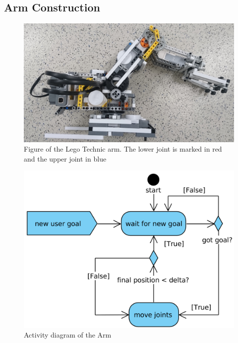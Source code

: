 \documentclass[conference]{IEEEtran}
\begin{document}
\subsection{Arm Construction}\label{sec:construction}
\begin{figure}[bt] 
	\centering
	\includegraphics[width=\textwidth/2]{img/arm_full}
	\caption[caption]{Figure of the Lego Technic arm. The lower joint is marked in red and the upper joint in blue}
	\label{fig:arm_full}
\end{figure}
\begin{figure}[bt] 
	\centering
	\includegraphics[width=\textwidth/2]{img/control_arm.png}
	\caption[caption]{Activity diagram of the Arm}
\label{fig:activitiy_arm}
\end{figure}
\end{document}
